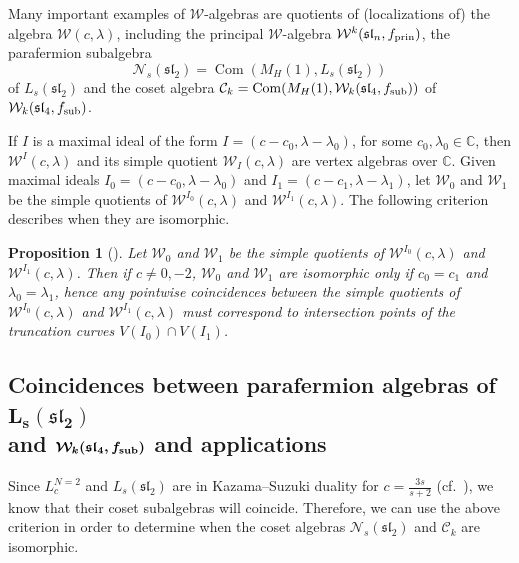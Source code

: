 \documentclass[pdftex]{sigma}
\numberwithin{equation}{section}
\newtheorem{Proposition}[Theorem]{Proposition}
\begin{document}
 Many important examples of $\mathcal W$-algebras are quotients of (localizations of) the algebra $\mathcal W (c, \lambda)$, including the principal $\mathcal W$-algebra $\mathcal W^k(\mathfrak{sl}_n, f_{\rm prin})$, the parafermion subalgebra
 \[
 \mathcal N_s(\mathfrak{sl}_2) = \operatorname{Com} (M_H(1) , L_s(\mathfrak{sl}_2))
 \]
 of $L_s(\mathfrak{sl}_2)$ and the coset algebra $ \mathcal C_k = \operatorname{Com} (M_H(1) ,\mathcal W_k(\mathfrak{sl}_4, f_{\rm sub})) $ of $\mathcal W_k(\mathfrak{sl}_4, f_{\rm sub})$.

 If $I$ is a maximal ideal of the form $I = (c-c_0, \lambda - \lambda_0)$, for some $c_0, \lambda_0 \in \mathbb{C}$, then $\mathcal W ^{I}(c, \lambda)$ and its simple quotient $\mathcal W_{I}(c, \lambda)$ are vertex algebras over $\mathbb{C}$. Given maximal ideals $I_0 = (c-c_0, \lambda - \lambda_0)$ and $I_1 = (c-c_1, \lambda - \lambda_1)$, let $\mathcal W_0$ and $\mathcal W_1$ be the simple quotients of $\mathcal W^{I_0} (c, \lambda)$ and $\mathcal W^{I_1} (c, \lambda)$.
 The following criterion describes when they are isomorphic.

\begin{Proposition}[{\cite[Corollary 10.1]{Linshaw}}]
	Let $\mathcal W_0$ and $\mathcal W_{1}$ be the simple quotients of $\mathcal W^{I_0} (c, \lambda)$ and~$\mathcal W^{I_1} (c, \lambda)$. Then if $c \neq 0,-2$, $\mathcal W_0$ and $\mathcal W_{1}$ are isomorphic only if $c_0 = c_1$ and $\lambda_0 = \lambda_1$, hence any pointwise coincidences between the simple quotients of $\mathcal W^{I_0} (c, \lambda)$ and $\mathcal W^{I_1} (c, \lambda)$ must correspond to intersection points of the truncation curves $V(I_0) \cap V(I_1)$.
\end{Proposition}

\subsection[Coincidences between parafermion algebras of L\_s(sl\_2) and W\_k(sl\_4, f\_sub) and applications]{Coincidences between parafermion algebras of $\boldsymbol{ L_s(\mathfrak{sl}_2)}$ \\
and $\boldsymbol{\mathcal W_k(\mathfrak{sl}_4, f_{\rm sub})}$ and applications}

Since $L^{N=2}_c$ and $L_s(\mathfrak{sl}_2)$ are in Kazama--Suzuki duality for $c =\frac{3s}{s+2}$ (cf.\ \cite{A-IMRN}), we know that their coset subalgebras will coincide. Therefore, we can use the above criterion in order to determine when the coset algebras $ \mathcal N_s(\mathfrak{sl}_2)$ and $\mathcal C_k$ are isomorphic.
\end{document}
